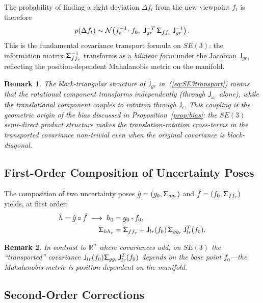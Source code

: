 \documentclass[journal]{IEEEtran}
\newcommand{\real}{\mathbb{R}}
\newcommand{\sfSigma}[1]{\mathsf{\Sigma}_\mathnormal{#1}}
\newcommand{\beq}{\begin{equation}}
\newcommand{\eeq}{\end{equation}}
\newtheorem{remark}{Remark}
\begin{document}
The probability of finding a right deviation $\Delta f_t$
from the new viewpoint $f_t$ is therefore
\beq
    p(\Delta f_t) \sim
    \mathcal{N}\!\left(f_t^{-1}\!\cdot f_0,\;
    \mathsf{J}_{gr}^{-T}\, \sfSigma{ff_r}\, \mathsf{J}_{gr}^{-1}\right).
    \label{eq:covtransport}
\eeq
This is the fundamental covariance transport formula on $SE(3)$:
the information matrix $\sfSigma{ff_r}^{-1}$ transforms
as a \emph{bilinear form} under the Jacobian $\mathsf{J}_{gr}$,
reflecting the position-dependent Mahalanobis metric on the manifold.

\begin{remark}
The block-triangular structure of $\mathsf{J}_{gr}$ in~(\ref{eq:SE3transport})
means that the rotational component transforms independently
(through $\mathsf{J}_{\omega_r}$ alone), while the translational
component couples to rotation through $\mathsf{J}_t$.
This coupling is the geometric origin of the bias discussed
in Proposition~\ref{prop:bias}: the $SE(3)$ semi-direct product
structure makes the translation-rotation cross-terms in the
transported covariance non-trivial even when the original
covariance is block-diagonal.
\end{remark}

\subsection{First-Order Composition of Uncertainty Poses}

The composition of two uncertainty poses 
$\hat{g} = (g_0, \sfSigma{gg_r})$ and 
$\hat{f} = (f_0, \sfSigma{ff_r})$ yields, 
at first order:
\beq
\begin{split}
    \hat{h} = \hat{g} \circ \hat{f} \;\longrightarrow\;
    h_0 &= g_0 \cdot f_0, \\
    \sfSigma{hh_r} &= \sfSigma{ff_r} + 
    \mathsf{J}_{lr}(f_0)\, \sfSigma{gg_r}\, 
    \mathsf{J}_{lr}^T(f_0).
\end{split}
\label{eq:firstordercomp}
\eeq

\begin{remark}
In contrast to $\real^n$ where covariances add, 
on $SE(3)$ the ``transported'' covariance 
$\mathsf{J}_{lr}(f_0)\sfSigma{gg_r}\mathsf{J}_{lr}^T(f_0)$ 
depends on the base point $f_0$---the Mahalanobis metric 
is position-dependent on the manifold.
\end{remark}

\subsection{Second-Order Corrections}
\label{subsec:secondorder}
\end{document}
